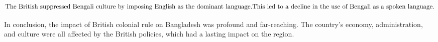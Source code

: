 \begin{equation}
\text{The British suppressed Bengali culture by imposing English as the dominant language.}\\
\text{This led to a decline in the use of Bengali as a spoken language.}\\
\end{equation}

In conclusion, the impact of British colonial rule on Bangladesh was profound and far-reaching. The country's economy, administration, and culture were all affected by the British policies, which had a lasting impact on the region.